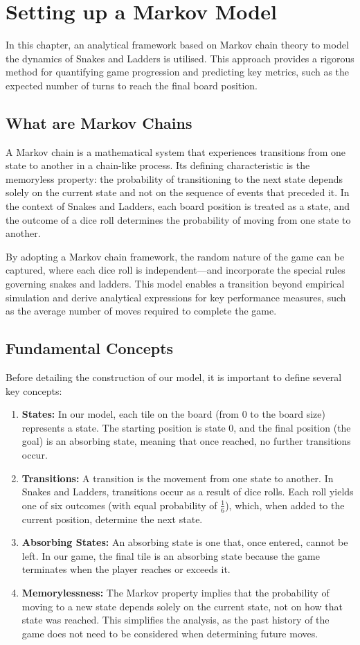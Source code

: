 \chapter{Setting up a Markov Model}
In this chapter, an analytical framework based on Markov chain theory to model the dynamics of Snakes and Ladders is utilised. This approach provides a rigorous method for quantifying game progression and predicting key metrics, such as the expected number of turns to reach the final board position. 

\section{What are Markov Chains}
A Markov chain is a mathematical system that experiences transitions from one state to another in a chain-like process. Its defining characteristic is the memoryless property: the probability of transitioning to the next state depends solely on the current state and not on the sequence of events that preceded it. In the context of Snakes and Ladders, each board position is treated as a state, and the outcome of a dice roll determines the probability of moving from one state to another.

By adopting a Markov chain framework, the random nature of the game can be captured, where each dice roll is independent—and incorporate the special rules governing snakes and ladders. This model enables a transition beyond empirical simulation and derive analytical expressions for key performance measures, such as the average number of moves required to complete the game.

\section{Fundamental Concepts}
Before detailing the construction of our model, it is important to define several key concepts:
\begin{enumerate}
	\item 	\textbf{States:} In our model, each tile on the board (from 0 to the board size) represents a state. The starting position is state 0, and the final position (the goal) is an absorbing state, meaning that once reached, no further transitions occur.
	\item \textbf{Transitions:} A transition is the movement from one state to another. In Snakes and Ladders, transitions occur as a result of dice rolls. Each roll yields one of six outcomes (with equal probability of 	$\frac{1}{6}$), which, when added to the current position, determine the next state.
	\item \textbf{Absorbing States: }An absorbing state is one that, once entered, cannot be left. In our game, the final tile is an absorbing state because the game terminates when the player reaches or exceeds it.
	\item \textbf{Memorylessness: }The Markov property implies that the probability of moving to a new state depends solely on the current state, not on how that state was reached. This simplifies the analysis, as the past history of the game does not need to be considered when determining future moves.
\end{enumerate}

